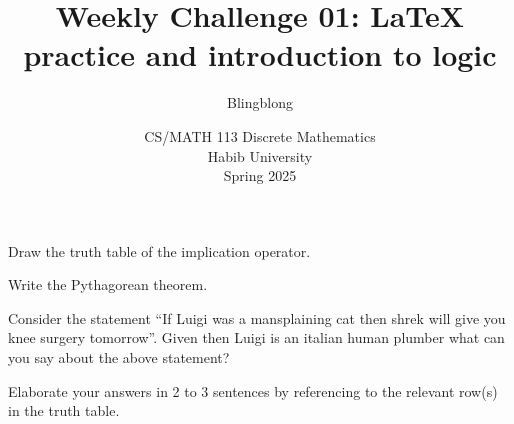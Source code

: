 \documentclass[a4paper]{exam}
\title{Weekly Challenge 01: \LaTeX\; practice and introduction to logic}
\author{Blingblong} %
\date{CS/MATH 113 Discrete Mathematics\\Habib University\\Spring 2025}
\begin{document}
\maketitle

\begin{questions}
  
 Draw the truth table of the implication operator.
\begin{solution}
\end{solution}

 Write the Pythagorean theorem.
\begin{solution}
\end{solution}

 Consider the statement ``If Luigi was a mansplaining cat then shrek will give you knee surgery tomorrow''. Given then Luigi is an italian human plumber what can you say about the above statement?

Elaborate your answers in 2 to 3 sentences by referencing to the relevant row(s) in the truth table.
\begin{solution}
\end{solution}


      
\end{questions}
\end{document}
